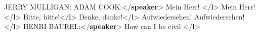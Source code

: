 \begin{shaded}
\hspace*{1em}JERRY MULLIGAN: ADAM COOK:{</\textbf{speaker}>}\mbox{}\newline 
\hspace*{1em}\mbox{}\newline 
\hspace*{1em}\hspace*{1em}Mein Herr! {</\textbf{l}>}\mbox{}\newline 
\hspace*{1em}\hspace*{1em}Mein Herr!{</\textbf{l}>}\mbox{}\newline 
\hspace*{1em}\hspace*{1em}Bitte, bitte!{</\textbf{l}>}\mbox{}\newline 
\hspace*{1em}\hspace*{1em}Denke, danke!{</\textbf{l}>}\mbox{}\newline 
\hspace*{1em}\hspace*{1em}Aufwiedersehen! Aufwiedersehen!{</\textbf{l}>}\mbox{}\newline 
\hspace*{1em}\mbox{}\newline 
{}\mbox{}\newline 
{}\mbox{}\newline 
\hspace*{1em}HENRI BAUREL:{</\textbf{speaker}>}\mbox{}\newline 
\hspace*{1em}\mbox{}\newline 
\hspace*{1em}\hspace*{1em}How can I be civil {</\textbf{l}>}\mbox{}\newline 

\end{shaded}
